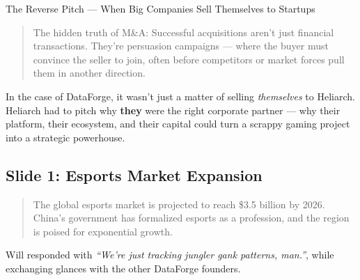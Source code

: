 \begin{HistoricalSidebar}{The Reverse Pitch — When Big Companies Sell Themselves to Startups}
    \medskip
    
    \begin{quote}
        The hidden truth of M\&A:  
        Successful acquisitions aren’t just financial transactions.  
        They’re persuasion campaigns — where the buyer must convince the seller to join,  
        often before competitors or market forces pull them in another direction.
    \end{quote}
    
    In the case of DataForge, it wasn’t just a matter of selling \textit{themselves} to Heliarch.  
    Heliarch had to pitch why \textbf{they} were the right corporate partner —  
    why their platform, their ecosystem, and their capital could turn a scrappy gaming project into a strategic powerhouse.
\end{HistoricalSidebar}


\subsection{Slide 1: Esports Market Expansion}

\begin{quote}
The global esports market is projected to reach \$3.5 billion by 2026. China’s government has formalized esports as a profession, and the region is poised for exponential growth.
\end{quote}
    
Will responded with \textit{``We’re just tracking jungler gank patterns, man.''},  while exchanging glances with the other DataForge founders.

\medskip

